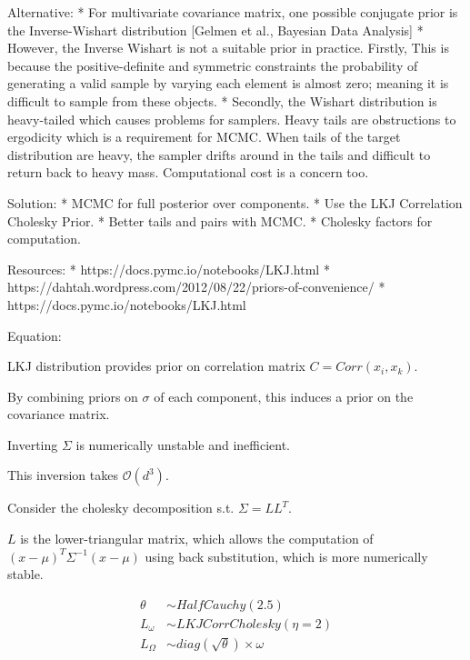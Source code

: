 \documentclass[11pt]{article}
\begin{document}
Alternative: * For multivariate covariance matrix, one possible
conjugate prior is the Inverse-Wishart distribution {[}Gelmen et al.,
Bayesian Data Analysis{]} * However, the Inverse Wishart is not a
suitable prior in practice. Firstly, This is because the
positive-definite and symmetric constraints the probability of
generating a valid sample by varying each element is almost zero;
meaning it is difficult to sample from these objects. * Secondly, the
Wishart distribution is heavy-tailed which causes problems for samplers.
Heavy tails are obstructions to ergodicity which is a requirement for
MCMC. When tails of the target distribution are heavy, the sampler
drifts around in the tails and difficult to return back to heavy mass.
Computational cost is a concern too.

Solution: * MCMC for full posterior over components. * Use the LKJ
Correlation Cholesky Prior. * Better tails and pairs with MCMC. *
Cholesky factors for computation.

Resources: * https://docs.pymc.io/notebooks/LKJ.html *
https://dahtah.wordpress.com/2012/08/22/priors-of-convenience/ *
https://docs.pymc.io/notebooks/LKJ.html

    Equation:

LKJ distribution provides prior on correlation matrix
\(C=Corr(x_{i}, x_{k})\).

By combining priors on \(\sigma\) of each component, this induces a
prior on the covariance matrix.

Inverting \(\Sigma\) is numerically unstable and inefficient.

This inversion takes \(\mathcal{O}(d^3)\).

Consider the cholesky decomposition s.t. \(\Sigma= L L^T\).

\(L\) is the lower-triangular matrix, which allows the computation of
\((x-\mu)^T \Sigma^{-1} (x-\mu)\) using back substitution, which is more
numerically stable.

\begin{align}
\theta &\sim HalfCauchy(2.5) \\
L_\omega &\sim LKJCorrCholesky(\eta =2 ) \\
L_\Omega &\sim diag(\sqrt{\theta}) \times \omega
\end{align}
\end{document}
